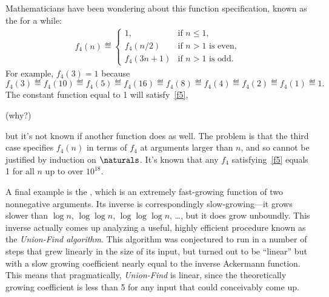 Mathematicians have been wondering about this function specification, 
known as the  for a while:
\begin{eqnarray}\label{f5}
f_4(n) \eqdef\begin{cases}
 1, & \text{if $n\le 1$},\\
 f_4(n/2) &  \text{if $n>1$ is even},\\
 f_4(3n+1)& \text{if $n>1$ is odd}.
\end{cases}
\end{eqnarray}
For example, $f_4(3)=1$ because
\[
f_4(3)\eqdef f_4(10)\eqdef f_4(5)\eqdef f_4(16)\eqdef f_4(8)\eqdef
f_4(4)\eqdef f_4(2)\eqdef f_4(1)\eqdef 1.
\]
The constant function equal to 1 will satisfy~\eqref{f5}, 
\begin{editingnotes}
(why?)
\end{editingnotes}
but it's not known if another function does as well.  The problem is that the third case
specifies $f_4(n)$ in terms of $f_4$ at arguments larger than $n$, and so
cannot be justified by induction on $\naturals$.  It's known that any
$f_4$ satisfying~\eqref{f5} equals 1 for all $n$ up to over $10^{18}$.

\iffalse
\textbf{Quick exercise:} Why does the constant function 1
satisfy~\eqref{f5}?
\fi

A final example is the , which is an extremely
fast-growing function of two nonnegative arguments.  Its inverse is
correspondingly slow-growing---it grows slower than $\log n$, $\log \log
n$, $\log \log \log n$, \dots, but it does grow unboundly.  This inverse
actually comes up analyzing a useful, highly efficient procedure known as
the \emph{Union-Find algorithm}.  This algorithm was conjectured to run in
a number of steps that grew linearly in the size of its input, but turned
out to be ``linear'' but with a slow growing coefficient nearly equal to
the inverse Ackermann function.  This means that pragmatically,
\emph{Union-Find} is linear, since the theoretically growing coefficient is
less than 5 for any input that could conceivably come up.

\iffalse
You will learn about Union-Find if you take the Algorithms course, 6.046.
We're mentioning this story to motivate an examination of the somewhat
unusual recursive definition of Ackermann's function, $A(m,n)$.
\fi

